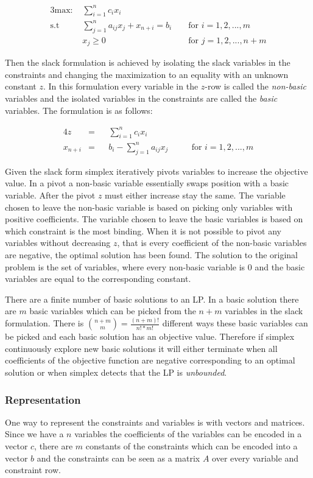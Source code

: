 \begin{alignat}{3}
\text{max: } &\sum_{i=1}^{n} c_i x_i\\
\text{s.t }  & \sum_{j=1}^{n} a_{ij} x_j + x_{n+i} = b_i  && \text{ for } i=1,2,...,m\\
& x_j \geq 0                                    && \text{ for } j=1,2,...,n+m
\end{alignat}

Then the slack formulation is achieved by isolating the slack variables in the constraints and changing the maximization to an equality with an unknown constant $z$. In this formulation every variable in the $z$-row is called the \textit{non-basic} variables and the isolated variables in the constraints are called the \textit{basic} variables. The formulation is as follows:

\begin{alignat}{4}
z        &= && \sum_{i=1}^{n} c_ix_i\\
x_{n+i}  &= && b_i - \sum_{j=1}^{n} a_{ij} x_j  &&& \text{ for } i=1,2,...,m
\end{alignat}

Given the slack form simplex iteratively pivots variables to increase the objective value. In a pivot a non-basic variable essentially swaps position with a basic variable. After the pivot $z$ must either increase stay the same. The variable chosen to leave the non-basic variable is based on picking only variables with positive coefficients. The variable chosen to leave the basic variables is based on which constraint is the most binding. When it is not possible to pivot any variables without decreasing $z$, that is every coefficient of the non-basic variables are negative, the optimal solution has been found. The solution to the original problem is the set of variables, where every non-basic variable is $0$ and the basic variables are equal to the corresponding constant.


There are a finite number of basic solutions to an LP. In a basic solution there are $m$ basic variables which can be picked from the $n + m$ variables in the slack formulation. There is ${{n+m}\choose{m}} = \frac{(n+m)!}{n!*m!}$ different ways these basic variables can be picked and each basic solution has an objective value. Therefore if simplex continuously explore new basic solutions it will either terminate when all coefficients of the objective function are negative corresponding to an optimal solution or when simplex detects that the LP is \textit{unbounded}.

\subsubsection{Representation}
One way to represent the constraints and variables is with vectors and matrices. Since we have a $n$ variables the coefficients of the variables can be encoded in a vector $c$, there are $m$ constants of the constraints which can be encoded into a vector $b$ and the constraints can be seen as a matrix $A$ over every variable and constraint row.
